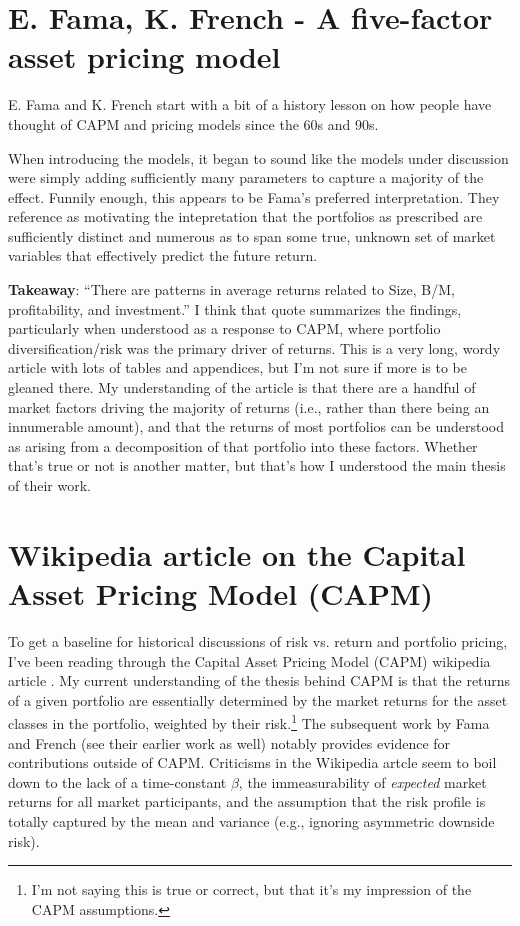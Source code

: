 \documentclass{article}
\begin{document}
\section{E. Fama, K. French - A five-factor asset pricing model}

E. Fama and K. French start \cite{Fama2015} with a bit of a history lesson on how people have thought of CAPM and pricing models since the 60s and 90s.  

When introducing the models, it began to sound like the models under discussion were simply adding sufficiently many parameters to capture a majority of the effect.  Funnily enough, this appears to be Fama's preferred interpretation.  They reference \cite{Fama1996} as motivating the intepretation that the portfolios as prescribed are sufficiently distinct and numerous as to span some true, unknown set of market variables that effectively predict the future return.

{\bf Takeaway}:  ``There are patterns in average returns related to Size,
B/M, profitability, and investment.'' I think that quote summarizes the findings, particularly when understood as a response to CAPM, where portfolio diversification/risk was the primary driver of returns.  This is a very long, wordy article with lots of tables and appendices, but I'm not sure if more is to be gleaned there.  My understanding of the article is that there are a handful of market factors driving the majority of returns (i.e., rather than there being an innumerable amount), and that the returns of most portfolios can be understood as arising from a decomposition of that portfolio into these factors.  Whether that's true or not is another matter, but that's how I understood the main thesis of their work.


\section{Wikipedia article on the Capital Asset Pricing Model (CAPM)}

To get a baseline for historical discussions of risk vs. return and portfolio pricing, I've been reading through the Capital Asset Pricing Model (CAPM) wikipedia article \cite{CAPM2026}.  My current understanding of the thesis behind CAPM is that the returns of a given portfolio are essentially determined by the market returns for the asset classes in the portfolio, weighted by their risk.\footnote{I'm not saying this is true or correct, but that it's my impression of the CAPM assumptions.}  The subsequent work by Fama and French \cite{Fama2015} (see their earlier work as well) notably provides evidence for contributions outside of CAPM.  Criticisms in the Wikipedia artcle seem to boil down to the lack of a time-constant $\beta$, the immeasurability of {\it expected} market returns for all market participants, and the assumption that the risk profile is totally captured by the mean and variance (e.g., ignoring asymmetric downside risk). 
\end{document}
